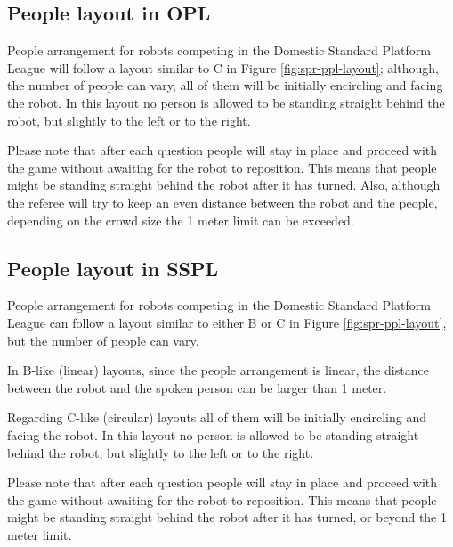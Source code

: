 \subsection{People layout in OPL}
People arrangement for robots competing in the Domestic Standard Platform League will follow a layout similar to C in Figure \ref{fig:spr-ppl-layout}; although, the number of people can vary, all of them will be initially encircling and facing the robot. In this layout no person is allowed to be standing straight behind the robot, but slightly to the left or to the right.

Please note that after each question people will stay in place and proceed with the game without awaiting for the robot to reposition. This means that people might be standing straight behind the robot after it has turned. Also, although the referee will try to keep an even distance between the robot and the people, depending on the crowd size the 1 meter limit can be exceeded.

\subsection{People layout in SSPL}
People arrangement for robots competing in the Domestic Standard Platform League can follow a layout similar to either B or C in Figure \ref{fig:spr-ppl-layout}, but the number of people can vary.

In B-like (linear) layouts, since the people arrangement is linear, the distance between the robot and the spoken person can be larger than 1 meter.

Regarding C-like (circular) layouts all of them will be initially encircling and facing the robot. In this layout no person is allowed to be standing straight behind the robot, but slightly to the left or to the right.

Please note that after each question people will stay in place and proceed with the game without awaiting for the robot to reposition. This means that people might be standing straight behind the robot after it has turned, or beyond the 1 meter limit.